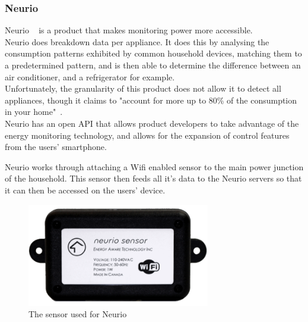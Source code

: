 \documentclass[draft,preprint,12pt,3p]{elsarticle}
\begin{document}
\subsubsection{Neurio}

Neurio ~\cite{neurio} is a product that makes monitoring power more accessible.\\ 
Neurio does breakdown data per appliance. It does this by analysing the consumption patterns exhibited by common household devices, matching them to a predetermined pattern, and is then able to determine the difference between an air conditioner, and a refrigerator for example. \\
Unfortunately, the granularity of this product does not allow it to detect all appliances, though it claims to "account for more up to 80\% of the consumption in your home"~\cite{neurio-detection}.\\ Neurio has an open API that allows product developers to take advantage of the energy monitoring technology, and allows for the expansion of control features from the users' smartphone.

Neurio works through attaching a Wifi enabled sensor to the main power junction of the household. This sensor then feeds all it's data to the Neurio servers so that it can then be accessed on the users' device.
\begin{figure}[h]
    \centering
    \includegraphics[width=8cm]{existing/neurio-sensor}
    \caption {The sensor used for Neurio}
\end{figure}
\end{document}
